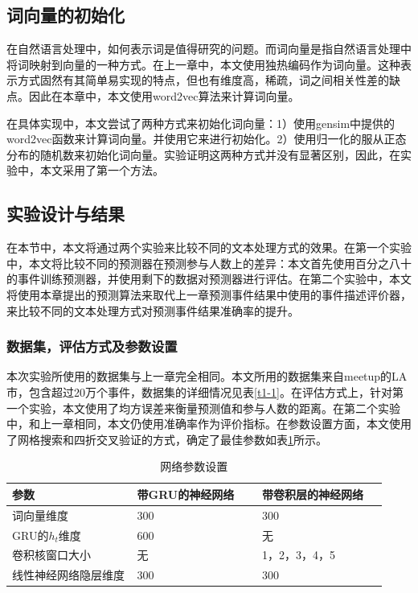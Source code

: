 \subsection{词向量的初始化}
在自然语言处理中，如何表示词是值得研究的问题。而词向量是指自然语言处理中将词映射到向量的一种方式。在上一章中，本文使用独热编码作为词向量。这种表示方式固然有其简单易实现的特点，但也有维度高，稀疏，词之间相关性差的缺点。因此在本章中，本文使用word2vec算法来计算词向量。

在具体实现中，本文尝试了两种方式来初始化词向量：1）使用gensim中提供的word2vec函数来计算词向量。并使用它来进行初始化。2）使用归一化的服从正态分布的随机数来初始化词向量。实验证明这两种方式并没有显著区别，因此，在实验中，本文采用了第一个方法。
\subsection{实验设计与结果}
在本节中，本文将通过两个实验来比较不同的文本处理方式的效果。在第一个实验中，本文将比较不同的预测器在预测参与人数上的差异：本文首先使用百分之八十的事件训练预测器，并使用剩下的数据对预测器进行评估。在第二个实验中，本文将使用本章提出的预测算法来取代上一章预测事件结果中使用的事件描述评价器，来比较不同的文本处理方式对预测事件结果准确率的提升。
\subsubsection{数据集，评估方式及参数设置}
本次实验所使用的数据集与上一章完全相同。本文所用的数据集来自meetup的LA市，包含超过20万个事件，数据集的详细情况见表\ref{t1-1}。在评估方式上，针对第一个实验，本文使用了均方误差来衡量预测值和参与人数的距离。在第二个实验中，和上一章相同，本文仍使用准确率作为评价指标。在参数设置方面，本文使用了网格搜索和四折交叉验证的方式，确定了最佳参数如表\ref{t2-1}所示。

\begin{table}[htb]
\caption{\label{t2-1}网络参数设置}
\centering
\begin{tabular*}{\linewidth}{m{0.333\linewidth}m{0.333\linewidth}m{0.333\linewidth}}
\toprule
    参数         & 带GRU的神经网络 & 带卷积层的神经网络 \\
\midrule
    词向量维度      & 300       & 300       \\
    GRU的\(h_t\)维度   & 600       & 无         \\
    卷积核窗口大小    & 无         & 1，2，3，4，5 \\
    线性神经网络隐层维度 & 300       & 300      \\ 
\bottomrule
\end{tabular*}
\end{table}

